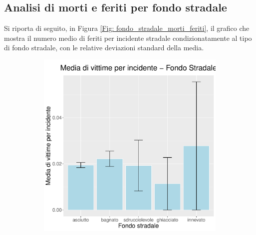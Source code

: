 \documentclass[12pt,a4paper,final,oneside]{article}			%
\begin{document}
    \subsection{Analisi di morti e feriti per fondo stradale}
        Si riporta di seguito, in Figura \ref{Fig: fondo_stradale_morti_feriti}, il grafico che mostra il numero medio di feriti per incidente stradale condizionatamente al tipo di fondo stradale, con le relative deviazioni standard della media.
        \begin{figure}[h]
            \begin{subfigure}{0.4\textwidth}
                \centering
                \includegraphics[scale=0.4]{../results/media_morti_per_incidente_fondo.pdf}
            \end{subfigure}
            \hfill
            \begin{subfigure}{0.4\textwidth}
                \centering

\end{subfigure}
\end{figure}
\end{document}
